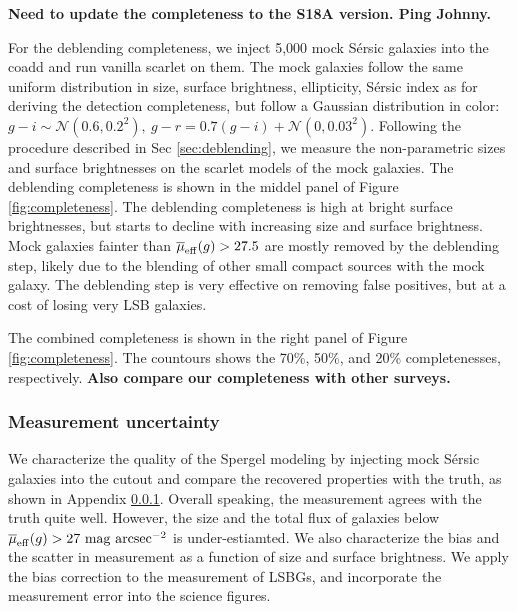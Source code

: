 \documentclass[twocolumn,astrosymb,twocolappendix]{aastex631}
\newcommand{\sbunit}{\mathrm{mag\ arcsec}^{-2}}
\newcommand{\sersic}{S\'ersic}
\begin{document}
\begin{CJK*}{UTF8}{gbsn}
\textbf{Need to update the completeness to the S18A version. Ping Johnny.}

For the deblending completeness, we inject 5,000 mock \sersic{} galaxies into the coadd and run vanilla scarlet on them. The mock galaxies follow the same uniform distribution in size, surface brightness, ellipticity, \sersic{} index as for deriving the detection completeness, but follow a Gaussian distribution in color: $g-i \sim \mathcal{N}(0.6, 0.2^2),\ g-r = 0.7 (g-i) + \mathcal{N}(0, 0.03^2)$. Following the procedure described in Sec \ref{sec:deblending}, we measure the non-parametric sizes and surface brightnesses on the scarlet models of the mock galaxies. The deblending completeness is shown in the middel panel of Figure \ref{fig:completeness}. The deblending completeness is high at bright surface brightnesses, but starts to decline with increasing size and surface brightness. Mock galaxies fainter than $\overline{\mu}_{\rm eff}(g) > 27.5$ are mostly removed by the deblending step, likely due to the blending of other small compact sources with the mock galaxy. The deblending step is very effective on removing false positives, but at a cost of losing very LSB galaxies. 

The combined completeness is shown in the right panel of Figure \ref{fig:completeness}. The countours shows the 70\%, 50\%, and 20\% completenesses, respectively. \textbf{Also compare our completeness with other surveys.}


\subsubsection{Measurement uncertainty}\label{sec:meas_unc}
We characterize the quality of the Spergel modeling by injecting mock \sersic{} galaxies into the cutout and compare the recovered properties with the truth, as shown in Appendix \ref{sec:meas_unc}. Overall speaking, the measurement agrees with the truth quite well. However, the size and the total flux of galaxies below $\overline{\mu}_{\rm eff} (g) > 27\ \sbunit$ is under-estiamted. We also characterize the bias and the scatter in measurement as a function of size and surface brightness. We apply the bias correction to the measurement of LSBGs, and incorporate the measurement error into the science figures. 


\end{CJK*}
\end{document}

